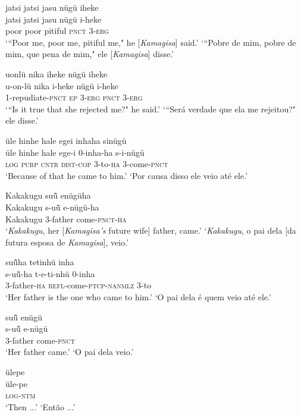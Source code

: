 \documentclass[output=paper,
modfonts,nonflat
]{langsci/langscibook}
\begin{document}
\ea  jatsi jatsi jasu nügü iheke\\[.3em]
\gll jatsi jatsi jasu nügü i-heke\\
     poor poor pitiful \textsc{pnct} 3-\textsc{erg}\\
\glt ‘“Poor me, poor me, pitiful me," he [\textit{Kamagisa}] said.’
\glt ‘“Pobre de mim, pobre de mim, que pena de mim," ele [\textit{Kamagisa}] disse.’
\z

\ea  uonlü nika iheke nügü iheke\\[.3em]
\gll u-on-lü nika i-heke nügü i-heke\\
     \textsc{1}-repudiate-\textsc{pnct} \textsc{ep} 3-\textsc{erg} \textsc{pnct} 3-\textsc{erg}\\
\glt ‘“Is it true that she rejected me?" he said.’
\glt ‘“Será verdade que ela me rejeitou?" ele disse.’
\z

\ea  üle hinhe hale egei inhaha sinügü\\[.3em]
\gll üle hinhe hale ege-i 0-inha-ha s-i-nügü\\
     \textsc{log} \textsc{purp} \textsc{cntr} \textsc{dist}-\textsc{cop} 3-to-\textsc{ha} 3-come-\textsc{pnct}\\
\glt ‘Because of that he came to him.’
\glt ‘Por causa disso ele veio até ele.’
\z

\ea  Kakakugu suü̃ enügüha\\[.3em]
\gll Kakakugu s-uü̃ e-nügü-ha\\
     Kakakugu 3-father come-\textsc{pnct}-\textsc{ha}\\
\glt ‘\textit{Kakakugu}, her [\textit{Kamagisa's} future wife] father, came.’
\glt ‘\textit{Kakakugu}, o pai dela [da futura esposa de \textit{Kamagisa}], veio.’
\z

\ea  suü̃ha tetinhü inha\\[.3em]
\gll s-uü̃-ha t-e-ti-nhü 0-inha\\
     3-father-\textsc{ha} \textsc{refl}-come-\textsc{ptcp}-\textsc{nanmlz} 3-to\\
\glt ‘Her father is the one who came to him.’
\glt ‘O pai dela é quem veio até ele.’
\z

\ea  suü̃ enügü\\[.3em]
\gll s-uü̃ e-nügü\\
     3-father come-\textsc{pnct}\\
\glt ‘Her father came.’
\glt ‘O pai dela veio.’
\z

\ea  ülepe\\[.3em]
\gll üle-pe\\
     \textsc{log}-\textsc{ntm}\\
\glt ‘Then ...’
\glt ‘Então ...’
\z
\end{document}
